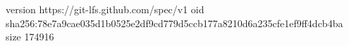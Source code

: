 version https://git-lfs.github.com/spec/v1
oid sha256:78e7a9cae035d1b0525e2df9cd779d5ccb177a8210d6a235cfe1ef9ff4dcb4ba
size 174916
